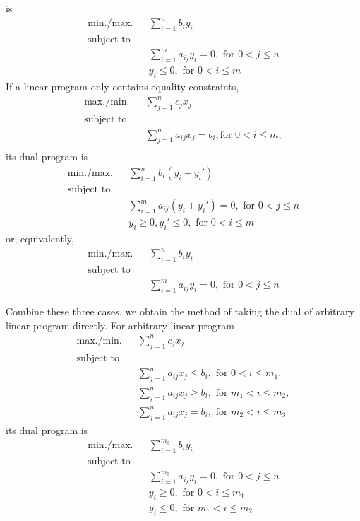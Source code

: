 \documentclass[a4paper,11pt,twocolumn]{article}
\begin{document}
  is
  \begin{align*}
    \text{min./max.} && \sum_{i = 1}^{n} b_iy_i \\
    \text{subject to} \\
    && \sum_{i = 1}^{m} a_{ij} y_i = 0 , \text{ for } 0 < j \leq n \\
    && y_i \leq 0, \text{ for } 0 < i \leq m
  \end{align*}
  If a linear program only contains equality constraints,
  \begin{align*}
    \text{max./min.} && \sum_{j = 1}^{n} c_j x_j \\
    \text{subject to} \\
    && \sum_{j = 1}^{n} a_{ij} x_j = b_i, \text{for } 0 < i \leq m, \\
  \end{align*}
  its dual program is
  \begin{align*}
    \text{min./max.} && \sum_{i = 1}^{n} b_i(y_i + y_i') \\
    \text{subject to} \\
    && \sum_{i = 1}^{m} a_{ij} (y_i + y_i') = 0 , \text{ for } 0 < j \leq n \\
    && y_i \geq 0, y_i' \leq 0, \text{ for } 0 < i \leq m
  \end{align*}
  or, equivalently,
  \begin{align*}
    \text{min./max.} && \sum_{i = 1}^{n} b_i y_i \\
    \text{subject to} \\
    && \sum_{i = 1}^{m} a_{ij} y_i = 0 , \text{ for } 0 < j \leq n
  \end{align*}

  Combine these three cases, we obtain the method of taking the dual of arbitrary linear program directly. For arbitrary linear program
  \begin{align*}
    \text{max./min.} && \sum_{j = 1}^{n} c_j x_j \\
    \text{subject to} \\
    && \sum_{j = 1}^{n} a_{ij} x_j \leq b_i, \text{ for } 0 < i \leq m_1, \\
    && \sum_{j = 1}^{n} a_{ij} x_j \geq b_i, \text{ for } m_1 < i \leq m_2, \\
    && \sum_{j = 1}^{n} a_{ij} x_j = b_i, \text{ for } m_2 < i \leq m_3
  \end{align*}
  its dual program is
  \begin{align*}
    \text{min./max.} && \sum_{i = 1}^{m_3} b_iy_i \\
    \text{subject to} \\
    && \sum_{i = 1}^{m_3} a_{ij} y_i  = 0, \text{ for } 0 < j \leq n \\
    && y_i \geq 0, \text{ for } 0 < i \leq m_1 \\
    && y_i \leq 0, \text{ for } m_1 < i \leq m_2 \\
  \end{align*}
\end{document}
